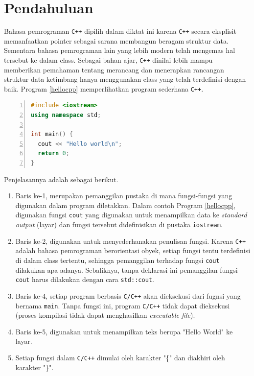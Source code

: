 \section{Pendahuluan}
Bahasa pemrograman \texttt{C++} dipilih dalam diktat ini karena \texttt{C++} secara eksplisit memanfaatkan pointer sebagai sarana membangun beragam struktur data. Sementara bahasa pemrograman lain yang lebih modern telah mengemas hal tersebut ke dalam class. Sebagai bahan ajar, \texttt{C++} dinilai lebih mampu memberikan pemahaman tentang merancang dan menerapkan rancangan struktur data ketimbang hanya menggunakan class yang telah terdefinisi dengan baik. Program \ref{hellocpp} memperlihatkan program sederhana \texttt{C++}.

\scriptsize
\begin{lstlisting}[language=c++, numbers=left, numberstyle=\tiny, caption=hello.cpp, showstringspaces=false, label=hellocpp]
#include <iostream>
using namespace std;

int main() {
  cout << "Hello world\n";
  return 0;
}
\end{lstlisting}
\normalsize

Penjelasannya adalah sebagai berikut.
\begin{enumerate}
\item Baris ke-1, merupakan pemanggilan pustaka di mana fungsi-fungsi yang digunakan dalam program diletakkan. Dalam contoh Program \ref{hellocpp}, digunakan fungsi \texttt{cout} yang digunakan untuk menampilkan data ke \textit{standard output} (layar) dan fungsi tersebut didefinisikan di pustaka \texttt{iostream}.
\item Baris ke-2, digunakan untuk menyederhanakan penulisan fungsi. Karena \texttt{C++} adalah bahasa pemrograman berorientasi obyek, setiap fungsi tentu terdefinisi di dalam class tertentu, sehingga pemanggilan terhadap fungsi \texttt{cout} dilakukan apa adanya. Sebaliknya, tanpa deklarasi ini pemanggilan fungsi \texttt{cout} harus dilakukan dengan cara \texttt{std::cout}.
\item Baris ke-4, setiap program berbasis \texttt{C/C++} akan dieksekusi dari fugnsi yang bernama \texttt{main}. Tanpa fungsi ini, program \texttt{C/C++} tidak dapat dieksekusi (proses kompilasi tidak dapat menghasilkan \textit{executable file}).
\item Baris ke-5, digunakan untuk menampilkan teks berupa "Hello World" ke layar.
\item Setiap fungsi dalam \texttt{C/C++} dimulai oleh karakter "\{" dan diakhiri oleh karakter "\}".
\end{enumerate}

